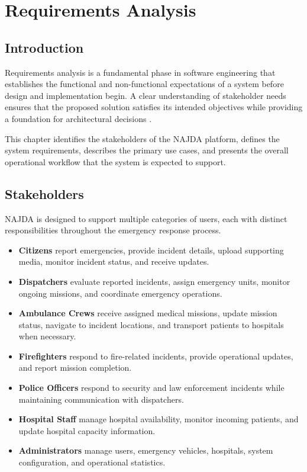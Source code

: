 \chapter{Requirements Analysis}
\label{chap:requirements}

\section{Introduction}

Requirements analysis is a fundamental phase in software engineering that establishes the functional and non-functional expectations of a system before design and implementation begin. A clear understanding of stakeholder needs ensures that the proposed solution satisfies its intended objectives while providing a foundation for architectural decisions \cite{pressman2020se,sommerville2016software}.

This chapter identifies the stakeholders of the NAJDA platform, defines the system requirements, describes the primary use cases, and presents the overall operational workflow that the system is expected to support.


\section{Stakeholders}

NAJDA is designed to support multiple categories of users, each with distinct responsibilities throughout the emergency response process.

\begin{itemize}
    \item \textbf{Citizens} report emergencies, provide incident details, upload supporting media, monitor incident status, and receive updates.
    \item \textbf{Dispatchers} evaluate reported incidents, assign emergency units, monitor ongoing missions, and coordinate emergency operations.
    \item \textbf{Ambulance Crews} receive assigned medical missions, update mission status, navigate to incident locations, and transport patients to hospitals when necessary.
    \item \textbf{Firefighters} respond to fire-related incidents, provide operational updates, and report mission completion.
    \item \textbf{Police Officers} respond to security and law enforcement incidents while maintaining communication with dispatchers.
    \item \textbf{Hospital Staff} manage hospital availability, monitor incoming patients, and update hospital capacity information.
    \item \textbf{Administrators} manage users, emergency vehicles, hospitals, system configuration, and operational statistics.
\end{itemize}

